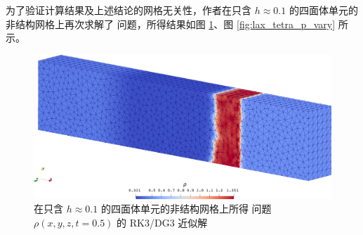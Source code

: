 为了验证计算结果及上述结论的网格无关性，作者在只含 $h\approx0.1$ 的四面体单元的非结构网格上再次求解了 问题，所得结果如图
\ref{fig:lax_tetra}、图 \ref{fig:lax_tetra_p_vary} 所示。

\begin{figure}[h!]
\begin{centering}
\includegraphics[width=1\textwidth]{../mdpi/figures/shock_tubes/lax/contour_tetra}
\par\end{centering}
\caption{\label{fig:lax_tetra}在只含 $h\approx0.1$ 的四面体单元的非结构网格上所得 问题
$\rho(x,y,z,t=0.5)$ 的 RK3/DG3 近似解}
\end{figure}

